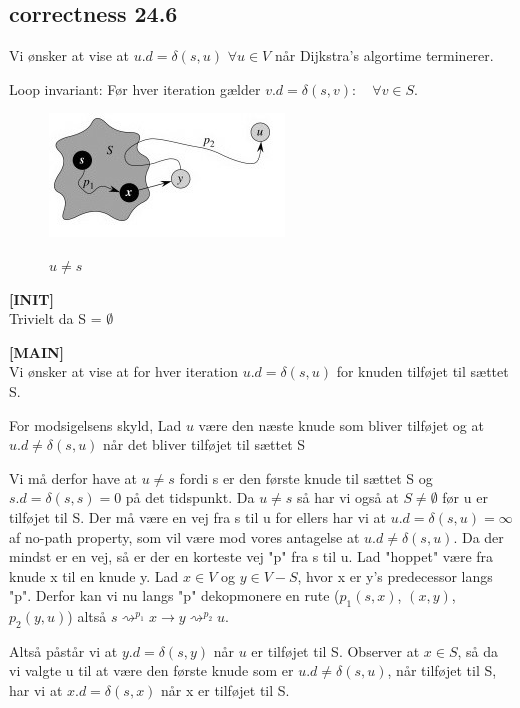 \documentclass[11pt,a4paper]{report}
\theoremstyle{plain}
\theoremstyle{definition}
\theoremstyle{remark}
\numberwithin{equation}{section}
\begin{document}
\subsection{correctness 24.6}
Vi ønsker at vise at $u.d = \delta(s,u) $ $\forall u \in V$ når Dijkstra's algortime terminerer.

Loop invariant: Før hver iteration gælder $v.d = \delta(s, v) : \quad \forall v \in S$.

\begin{figure}[H]
  \centering
  \includegraphics[scale=1]{dijkstra.jpg}\\
  \caption{$u\neq s$}
\end{figure}



\textbf{[INIT]}\\
Trivielt da S = $\emptyset$

\textbf{[MAIN]}\\
Vi ønsker at vise at for hver iteration $u.d=\delta(s,u)$ for knuden tilføjet til sættet S.

For modsigelsens skyld, Lad $u$ være den næste knude som bliver tilføjet og at $u.d \neq \delta(s,u)$ når det bliver tilføjet til sættet S

Vi må derfor have at $u \neq s$ fordi s er den første knude til sættet S og $s.d=\delta(s,s)=0$ på det tidspunkt. Da $u\neq s$ så har vi også at $S\neq \emptyset$ før u er tilføjet til S. Der må være en vej fra s til u for ellers har vi at $u.d=\delta(s,u)=\infty$ af no-path property, som vil være mod vores antagelse at $u.d\neq \delta(s,u)$. Da der mindst er en vej, så er der en korteste vej "p" fra s til u.  Lad "hoppet" være fra knude x til en knude y. Lad $x\in V$ og $y\in V-S$, hvor x er y's predecessor langs "p". Derfor kan vi nu langs "p" dekopmonere en rute ($p_1(s,x)$, $(x,y)$, $p_2(y,u)$) altså $s \rightsquigarrow^{p_1} x \rightarrow y \rightsquigarrow^{p_2} u$.

Altså påstår vi at $y.d = \delta(s,y)$ når $u$ er tilføjet til S. Observer at $x \in S$, så da vi valgte u til at være den første knude som er $u.d\neq \delta(s,u)$, når tilføjet til S, har vi at $x.d=\delta(s,x)$ når x er tilføjet til S.
\end{document}
